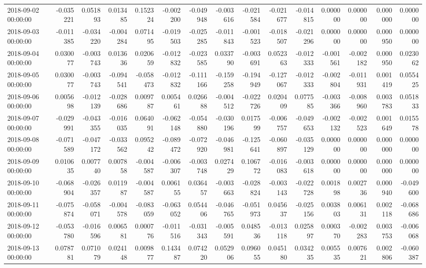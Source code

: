 \begin{tabular}{lrrrrrrrrrrrrrr}
2018-09-02 00:00:00 & -0.035221 & 0.051893 & 0.013485 & 0.152324 & -0.002200 & -0.049948 & -0.003616 & -0.021584 & -0.021677 & -0.014815 & 0.000000 & 0.000000 & 0.000000 & 0.000000 \\
2018-09-03 00:00:00 & -0.011385 & -0.034220 & -0.004284 & 0.071495 & -0.019503 & -0.025285 & -0.011843 & -0.001523 & -0.018507 & -0.021296 & 0.000000 & 0.000000 & 0.000950 & 0.000000 \\
2018-09-04 00:00:00 & 0.030077 & -0.003743 & 0.013636 & 0.020659 & -0.012832 & -0.023585 & 0.033790 & -0.003691 & 0.052363 & -0.012333 & -0.001561 & -0.002182 & 0.000950 & 0.023062 \\
2018-09-05 00:00:00 & 0.030077 & -0.003743 & -0.094541 & -0.058473 & -0.012832 & -0.111166 & -0.159258 & -0.194949 & -0.127067 & -0.012333 & -0.002804 & -0.011931 & 0.001419 & 0.055425 \\
2018-09-06 00:00:00 & 0.005698 & -0.012139 & -0.028686 & 0.009787 & 0.005461 & 0.026688 & -0.004512 & -0.022726 & 0.020409 & 0.077585 & -0.003366 & -0.008960 & 0.003783 & 0.051833 \\
2018-09-07 00:00:00 & -0.029991 & -0.043355 & -0.016035 & 0.064091 & -0.062148 & -0.054880 & -0.030196 & 0.017599 & -0.006757 & -0.049653 & -0.002132 & -0.002523 & 0.001649 & 0.015578 \\
2018-09-08 00:00:00 & -0.071589 & -0.047172 & -0.033562 & 0.095242 & -0.089472 & -0.072920 & -0.046981 & -0.125641 & -0.060897 & -0.035129 & 0.000000 & 0.000000 & 0.000000 & 0.000000 \\
2018-09-09 00:00:00 & 0.010635 & 0.007740 & 0.007858 & -0.004587 & -0.006307 & -0.003748 & 0.027429 & 0.106772 & -0.016083 & -0.003618 & 0.000000 & 0.000000 & 0.000000 & 0.000000 \\
2018-09-10 00:00:00 & -0.068904 & -0.026357 & 0.011987 & -0.004587 & 0.006155 & 0.036457 & -0.003663 & -0.028824 & -0.003143 & -0.022728 & 0.001898 & 0.002736 & 0.000940 & -0.049600 \\
2018-09-11 00:00:00 & -0.075874 & -0.058071 & -0.004578 & -0.083059 & -0.063052 & 0.054406 & -0.046765 & -0.051973 & 0.045637 & -0.025156 & 0.003803 & 0.006131 & 0.002118 & -0.068686 \\
2018-09-12 00:00:00 & -0.053780 & -0.016596 & 0.006581 & 0.000776 & -0.011516 & -0.031343 & -0.005591 & 0.048536 & -0.013118 & 0.025897 & 0.000370 & -0.002283 & 0.003753 & -0.006068 \\
2018-09-13 00:00:00 & 0.078781 & 0.071079 & 0.024148 & 0.009877 & 0.143487 & 0.074220 & 0.052906 & 0.096055 & 0.045180 & 0.034235 & 0.005535 & 0.007621 & 0.002806 & -0.060387 \\

\end{tabular}
